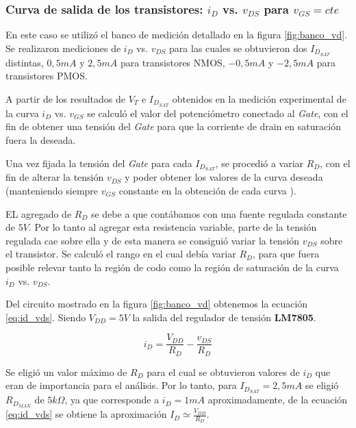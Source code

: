 \documentclass[10pt,spanish,a4paper,openany,notitlepage]{article}
\begin{document}
\subsubsection{Curva de salida de los transistores: $i_D$ vs. $v_{DS}$ para $v_{GS} = cte$}

En este caso se utilizó el banco de medición detallado en la figura \ref{fig:banco_vd}. Se realizaron mediciones de $i_D$ vs. $v_{DS}$ para las cuales se obtuvieron dos $I_{D_{SAT}}$ distintas, $0,5\unit{mA}$ y $2,5\unit{mA}$  para transistores NMOS,  $-0,5\unit{mA}$ y $-2,5\unit{mA}$ para transistores PMOS.


A partir de los resultados de $V_T$ e $I_{D_{SAT}}$ obtenidos en la medición experimental de la curva $i_D$ vs. $v_{GS}$ se calculó el valor del potenciómetro conectado al \emph{Gate}, con el fin de obtener una tensión del \emph{Gate} para que la corriente de drain en saturación fuera la deseada. 


Una vez fijada la tensión del \emph{Gate} para cada $I_{D_{SAT}}$, se procedió a variar $R_D$, con el fin de alterar la tensión $v_{DS}$  y poder obtener los valores de la curva deseada (manteniendo siempre $v_{GS}$ constante en la obtención de cada curva ).


EL agregado de $R_D$ se debe a que contábamos con una fuente regulada constante de $5\unit{V}$. Por lo tanto al agregar esta resistencia variable, parte de la tensión regulada cae sobre ella y de esta manera se consiguió variar la tensión $v_{DS}$ sobre el transistor. Se calculó el rango en el cual debía variar $R_D$, para que fuera posible relevar tanto la región de codo como la región de saturación de la curva $i_D$ vs. $v_{DS}$.  


Del circuito mostrado en la figura \ref{fig:banco_vd} obtenemos la ecuación \ref{eq:id_vds}. Siendo $V_{DD}= 5\unit{V}$ la salida del regulador de tensión \textbf{LM7805}.

\begin{equation}
i_D =\frac{V_{DD}}{R_D} - \frac{v_{DS}}{R_D}
\label{eq:id_vds}
\end{equation}
 
Se eligió un valor máximo de $R_D$ para el cual se obtuvieron valores de $i_D$ que eran de importancia para el análisis.
Por lo tanto, para $I_{D_{SAT}}=2,5 \unit{mA}$ se eligió $R_{D_{MAX}}$ de $5 \unit{k\Omega}$, ya que corresponde a $i_D = 1 \unit{mA}$ aproximadamente,  de la ecuación \ref{eq:id_vds} se obtiene la aproximación $I_D  \simeq \frac{V_{DD}}{R_D}$.
\end{document}
